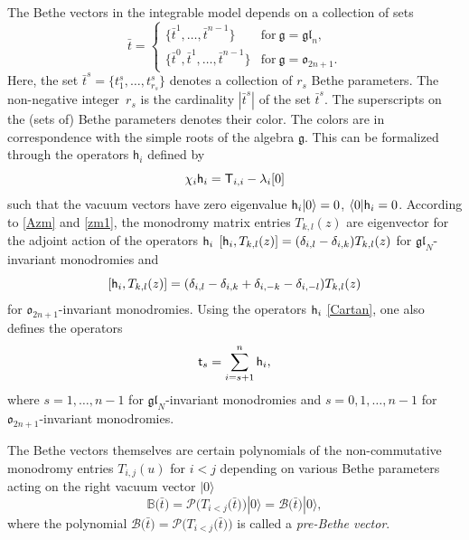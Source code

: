 \documentclass[10pt,a4paper]{amsart}
\newcommand{\bt}{{\bar t}}
\theoremstyle{definition}
\def\BB{{\mathbb{B}}}
\def\r#1{\eqref{#1}}
\def\sT{{\sf T}}
\def\rvec{|0\rangle}
\def\lvec{\langle0|}
\def\hc{{\sf h}}
\def\vk{\chi}
\begin{document}
The Bethe vectors
 in the integrable model
depends on a collection of sets
\[%
\bt=\begin{cases}
\bigl\{\bt^1,\dots,\bt^{n-1}\bigr\}&\text{for}\  \mathfrak{g}=\mathfrak{gl}_n,\\
\bigl\{\bt^0,\bt^1,\dots,\bt^{n-1}\bigr\}&\text{for}\  \mathfrak{g}=\mathfrak{o}_{2n+1}.
\end{cases}
\]
Here, the set $\bt^s=\{t^s_1,\dots,t^s_{r_s}\}$ denotes a collection of $r_s$
Bethe parameters. The non-negative integer~$r_s$ is the cardinality $|\bt^s|$ of the set
$\bt^s$.
The superscripts on the (sets of) Bethe parameters denotes their color.
 The colors are in correspondence with the simple roots of the algebra
 $\mathfrak{g}$.
This can be formalized through the operators $\mathsf{h}_i$ defined by
\begin{equation}\label{Cartan}
\vk_i \hc_i=\sT_{i,i}-\lambda_i[0]
\end{equation}
such that the vacuum vectors have zero eigenvalue
$
\hc_i \rvec =0$, $ \lvec \hc_i=0 $.
According to \r{Azm} and \r{zm1}, the monodromy matrix entries
$T_{k,l}(z)$ are eigenvector for the adjoint action of the operators
$\hc_i$
$
[\hc_i,T_{k,l}(z)]= (\delta_{i,l}-\delta_{i,k}) T_{k,l}(z)
$
for $\mathfrak{gl}_N$-invariant monodromies
and
\[%
[\hc_i,T_{k,l}(z)]=(\delta_{i,l}-\delta_{i,k}+\delta_{i,-k}-\delta_{i,-l}) T_{k,l}(z)
\]
for $\mathfrak{o}_{2n+1}$-invariant monodromies. Using the operators $\hc_i$ \r{Cartan}, one also defines the operators
\begin{equation}\label{col-op}
\mathsf{t}_s=\sum_{i=s+1}^n \hc_i ,
\end{equation}
where $s=1,\dots,n-1$ for $\mathfrak{gl}_N$-invariant monodromies
and $s=0,1,\dots,n-1$ for $\mathfrak{o}_{2n+1}$-invariant monodromies.

 The Bethe vectors themselves are certain
 polynomials of the non-commutative monodromy entries $T_{i,j}(u)$ for $i <j$ depending on various Bethe parameters acting on the right vacuum vector $\rvec$
\begin{equation}\label{bvgr}
\BB\bigl(\bar t\bigr)=\mathcal{P}\bigl(T_{i< j}
\bigl(\bar t\bigr)\bigr)
 \rvec=\mathcal{B}\bigl(\bar t\bigr) \rvec,
\end{equation}
where the polynomial $\mathcal{B}\bigl(\bar t\bigr)=\mathcal{P}\bigl(T_{i< j}\bigl(\bar t\bigr)\bigr)$ is called a \textit{pre-Bethe vector}.
\end{document}
